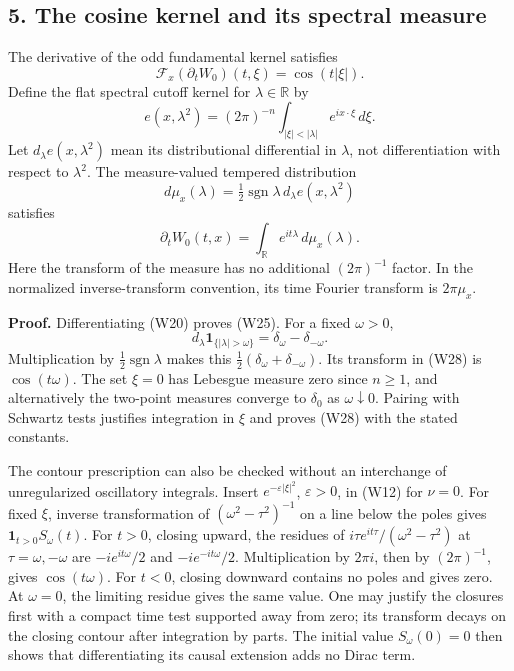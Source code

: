 \documentclass[
  11pt,
]{article}
\begin{document}
\subsection{5. The cosine kernel and its spectral
measure}\label{the-cosine-kernel-and-its-spectral-measure}

The derivative of the odd fundamental kernel satisfies \[
 \mathcal F_x(\partial_tW_0)(t,\xi)=\cos(t|\xi|).
 \tag{W25}
\] Define the flat spectral cutoff kernel for \(\lambda\in\mathbb R\) by
\[
 e(x,\lambda^2)=(2\pi)^{-n}\int_{|\xi|<|\lambda|}e^{ix\cdot\xi}\,d\xi.
 \tag{W26}
\] Let \(d_\lambda e(x,\lambda^2)\) mean its distributional differential
in \(\lambda\), not differentiation with respect to \(\lambda^2\). The
measure-valued tempered distribution \[
                         d\mu_x(\lambda)=\tfrac12
                    \operatorname{sgn}\lambda\,d_\lambda e(x,\lambda^2)
 \tag{W27}
\] satisfies \[
                  \partial_tW_0(t,x)=\int_{\mathbb R}e^{it\lambda}\,d\mu_x(\lambda).
 \tag{W28}
\] Here the transform of the measure has no additional \((2\pi)^{-1}\)
factor. In the normalized inverse-transform convention, its time Fourier
transform is \(2\pi\mu_x\).

\textbf{Proof.} Differentiating (W20) proves (W25). For a fixed
\(\omega>0\), \[
 d_\lambda\boldsymbol1_{\{|\lambda|>\omega\}}
              =\delta_\omega-\delta_{-\omega}.
 \tag{W29}
\] Multiplication by \(\tfrac12\operatorname{sgn}\lambda\) makes this
\(\tfrac12(\delta_\omega+\delta_{-\omega})\). Its transform in (W28) is
\(\cos(t\omega)\). The set \(\xi=0\) has Lebesgue measure zero since
\(n\geq1\), and alternatively the two-point measures converge to
\(\delta_0\) as \(\omega\downarrow0\). Pairing with Schwartz tests
justifies integration in \(\xi\) and proves (W28) with the stated
constants.

The contour prescription can also be checked without an interchange of
unregularized oscillatory integrals. Insert \(e^{-\varepsilon|\xi|^2}\),
\(\varepsilon>0\), in (W12) for \(\nu=0\). For fixed \(\xi\), inverse
transformation of \((\omega^2-\tau^2)^{-1}\) on a line below the poles
gives \(\boldsymbol1_{t>0}S_\omega(t)\). For \(t>0\), closing upward,
the residues of \(i\tau e^{it\tau}/(\omega^2-\tau^2)\) at
\(\tau=\omega,-\omega\) are \(-ie^{it\omega}/2\) and
\(-ie^{-it\omega}/2\). Multiplication by \(2\pi i\), then by
\((2\pi)^{-1}\), gives \(\cos(t\omega)\). For \(t<0\), closing downward
contains no poles and gives zero. At \(\omega=0\), the limiting residue
gives the same value. One may justify the closures first with a compact
time test supported away from zero; its transform decays on the closing
contour after integration by parts. The initial value \(S_\omega(0)=0\)
then shows that differentiating its causal extension adds no Dirac term.
\end{document}
